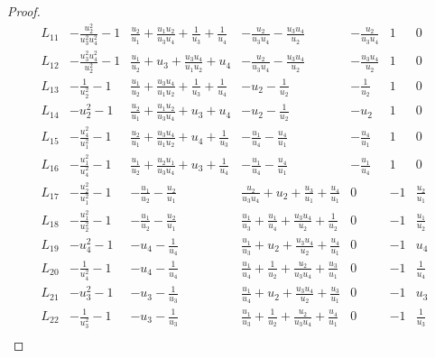 \documentclass[10pt,a4paper]{amsart}
\begin{document}
\begin{proof}
\begin{table}[h]
\begin{equation*}
\begin{array}{c||c|c|c|c|c|c|}
        \hline
        L_{11} &-\frac{u_2^2}{u_3^2 u_4^2}-1    &\frac{u_2}{u_1}+\frac{u_1 u_2}{u_3 u_4}+\frac{1}{u_3}+\frac{1}{u_4}  & -\frac{u_2}{u_3 u_4}-\frac{u_3 u_4}{u_2} &-\frac{u_2}{u_3 u_4}  & 1   & 0           \\
        \hline
        L_{12}  & -\frac{u_3^2 u_4^2}{u_2^2}-1  &\frac{u_1}{u_2}+u_3+\frac{u_3 u_4}{u_1 u_2}+u_4  & -\frac{u_2}{u_3 u_4}-\frac{u_3 u_4}{u_2} & -\frac{u_3 u_4}{u_2} & 1   & 0          \\
        \hline
        L_{13}  & -\frac{1}{u_2^2}-1  &\frac{u_1}{u_2}+\frac{u_3 u_4}{u_1 u_2}+\frac{1}{u_3}+\frac{1}{u_4}  & -u_2-\frac{1}{u_2} & -\frac{1}{u_2}  & 1   & 0           \\
        \hline
        L_{14}  & -u_2^2-1  & \frac{u_2}{u_1}+\frac{u_1 u_2}{u_3 u_4}+u_3+u_4 & -u_2-\frac{1}{u_2} & -u_2  & 1   & 0           \\
        \hline
        L_{15}  & -\frac{u_4^2}{u_1^2}-1  & \frac{u_2}{u_1}+\frac{u_3 u_4}{u_1 u_2}+u_4+\frac{1}{u_3} & -\frac{u_1}{u_4}-\frac{u_4}{u_1} & -\frac{u_4}{u_1}  & 1   & 0           \\
        \hline
        L_{16}  & -\frac{u_1^2}{u_4^2}-1  & \frac{u_1}{u_2}+\frac{u_2 u_1}{u_3 u_4}+u_3+\frac{1}{u_4} & -\frac{u_1}{u_4}-\frac{u_4}{u_1}  & -\frac{u_1}{u_4} & 1   & 0          \\
        \hline \hline
        L_{17}  & -\frac{u_2^2}{u_1^2}-1  & -\frac{u_1}{u_2}-\frac{u_2}{u_1} &\frac{u_2}{u_3 u_4}+u_2+\frac{u_3}{u_1}+\frac{u_4}{u_1} & 0 & -1   & \frac{u_2}{u_1}         \\
        \hline
        L_{18}  &-\frac{u_1^2}{u_2^2}-1  & -\frac{u_1}{u_2}-\frac{u_2}{u_1} & \frac{u_1}{u_3}+\frac{u_1}{u_4}+\frac{u_3 u_4}{u_2}+\frac{1}{u_2}  & 0 & -1   & \frac{u_1}{u_2}         \\
        \hline
        L_{19}  & -u_4^2-1 & -u_4-\frac{1}{u_4} & \frac{u_1}{u_3}+u_2+\frac{u_3 u_4}{u_2}+\frac{u_4}{u_1} & 0 & -1   & u_4          \\
        \hline
        L_{20}  & -\frac{1}{u_4^2}-1  & -u_4-\frac{1}{u_4} & \frac{u_1}{u_4}+\frac{1}{u_2}+\frac{u_2}{u_3 u_4}+\frac{u_3}{u_1} & 0 & -1   & \frac{1}{u_4}          \\
        \hline
        L_{21}  & -u_3^2-1 & -u_3-\frac{1}{u_3} & \frac{u_1}{u_4}+u_2+\frac{u_3 u_4}{u_2}+\frac{u_3}{u_1} & 0 & -1   & u_3        \\
        \hline
        L_{22}  & -\frac{1}{u_3^2}-1   & -u_3-\frac{1}{u_3} & \frac{u_1}{u_3}+\frac{1}{u_2}+\frac{u_2}{u_3 u_4}+\frac{u_4}{u_1} & 0 & -1   & \frac{1}{u_3}          \\

\end{array}
\end{equation*}
\end{table}
\end{proof}
\end{document}
